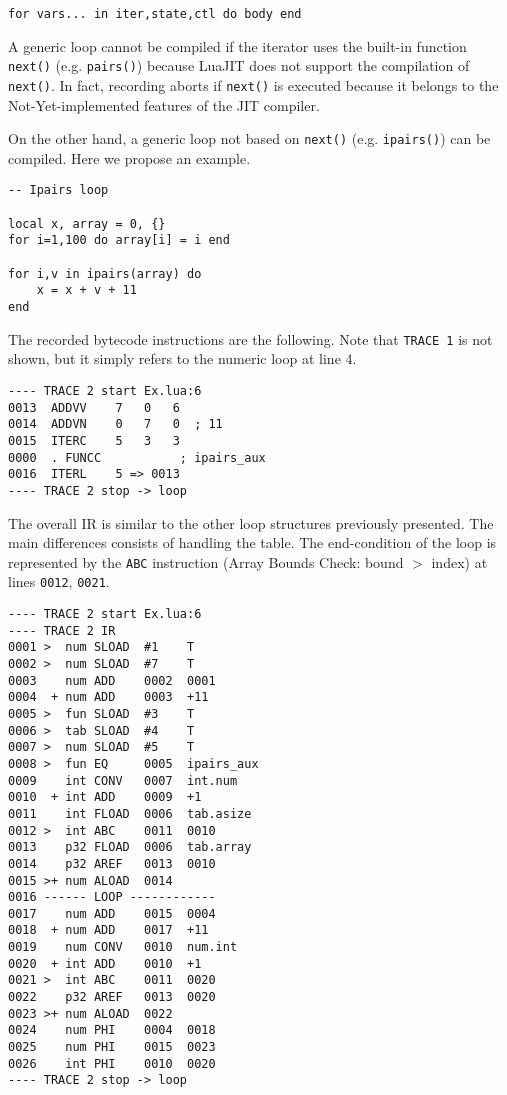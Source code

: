 \begin{mdframed}[style=LuaStyleFrame]
\begin{lstlisting}[style=LuaStyle]
for vars... in iter,state,ctl do body end
\end{lstlisting}
\end{mdframed}
\noindent
A generic loop cannot be compiled if the iterator uses the built-in function \texttt{next()} (e.g. \texttt{pairs()}) because LuaJIT does not support the compilation of \texttt{next()}. In fact, recording aborts if \texttt{next()} is executed because it belongs to the Not-Yet-implemented features of the JIT compiler.

On the other hand, a generic loop not based on \texttt{next()} (e.g. \texttt{ipairs()}) can be compiled. Here we propose an example.
\begin{mdframed}[style=LuaStyleFrame]
\begin{lstlisting}[style=LuaStyle]
-- Ipairs loop

local x, array = 0, {}
for i=1,100 do array[i] = i end

for i,v in ipairs(array) do
	x = x + v + 11	
end
\end{lstlisting}
\end{mdframed}
\noindent The recorded bytecode instructions are the following. Note that \texttt{TRACE 1} is not shown, but it simply refers to the numeric loop at line 4.
\begin{multicols}{2}
\begin{lstlisting}[style=DumpStyle]
---- TRACE 2 start Ex.lua:6
0013  ADDVV    7   0   6
0014  ADDVN    0   7   0  ; 11
0015  ITERC    5   3   3
0000  . FUNCC           ; ipairs_aux
0016  ITERL    5 => 0013
---- TRACE 2 stop -> loop
\end{lstlisting}
\end{multicols}
\noindent The overall IR is similar to the other loop structures previously presented. The main differences consists of handling the table. The end-condition of the loop is represented by the \texttt{ABC} instruction (Array Bounds Check: bound $>$ index) at lines \texttt{0012}, \texttt{0021}.
\begin{multicols}{2}
\begin{lstlisting}[style=DumpStyle]
---- TRACE 2 start Ex.lua:6
---- TRACE 2 IR
0001 >  num SLOAD  #1    T
0002 >  num SLOAD  #7    T
0003    num ADD    0002  0001
0004  + num ADD    0003  +11 
0005 >  fun SLOAD  #3    T
0006 >  tab SLOAD  #4    T
0007 >  num SLOAD  #5    T
0008 >  fun EQ     0005  ipairs_aux
0009    int CONV   0007  int.num
0010  + int ADD    0009  +1  
0011    int FLOAD  0006  tab.asize
0012 >  int ABC    0011  0010
0013    p32 FLOAD  0006  tab.array
0014    p32 AREF   0013  0010
0015 >+ num ALOAD  0014
0016 ------ LOOP ------------
0017    num ADD    0015  0004
0018  + num ADD    0017  +11 
0019    num CONV   0010  num.int
0020  + int ADD    0010  +1  
0021 >  int ABC    0011  0020
0022    p32 AREF   0013  0020
0023 >+ num ALOAD  0022
0024    num PHI    0004  0018
0025    num PHI    0015  0023
0026    int PHI    0010  0020
---- TRACE 2 stop -> loop
\end{lstlisting}
\end{multicols}

